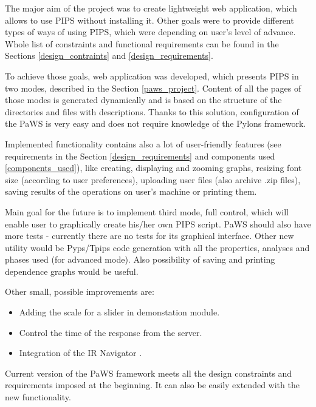 
The major aim of the project was to create lightweight web application, which allows to use PIPS without installing it. Other goals were to provide different types of ways of using PIPS, which were depending on user's level of advance. Whole list of constraints and functional requirements can be found in the Sections \ref{design_contraints} and \ref{design_requirements}.

To achieve those goals, web application was developed, which presents PIPS in two modes, described in the Section \ref{paws_project}. Content of all the pages of those modes is generated dynamically and is based on the structure of the directories and files with descriptions. Thanks to this solution, configuration of the PaWS is very easy and does not require knowledge of the Pylons framework.

Implemented functionality contains also a lot of user-friendly features (see requirements in the Section \ref{design_requirements} and components used \ref{components_used}), like creating, displaying and zooming graphs, resizing font size (according to user preferences), uploading user files (also archive .zip files), saving results of the operations on user's machine or printing them.

Main goal for the future is to implement third mode, full control, which will enable user to graphically create his/her own PIPS script. PaWS should also have more tests - currently there are no tests for its graphical interface. Other new utility would be Pyps/Tpips code generation with all the properties, analyses and phases used (for advanced mode). Also possibility of saving and printing dependence graphs would be useful.

Other small, possible improvements are:
\begin{itemize}
  \item Adding the scale for a slider in demonstation module.
  \item Control the time of the response from the server.
  \item Integration of the IR Navigator \cite{irnavigator}.
\end{itemize}

Current version of the PaWS framework meets all the design constraints and requirements imposed at the beginning. It can also be easily extended with the new functionality.